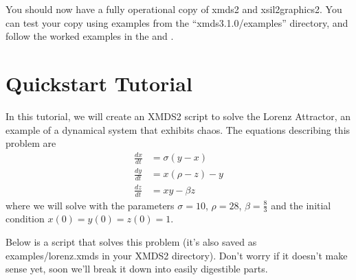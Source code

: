 \documentclass[letterpaper,10pt,english]{sphinxmanual}
\begin{document}
\sphinxAtStartPar
{} You should now have a fully operational copy of xmds2 and xsil2graphics2.  You can test your copy using examples from the “xmds\sphinxhyphen{}3.1.0/examples” directory, and follow the worked examples in the {\hyperref[\detokenize{tutorial:quickstarttutorial}]{}} and {\hyperref[\detokenize{worked_examples:workedexamples}]{}}.

\ignorespaces 

\chapter{Quickstart Tutorial}
\label{\detokenize{tutorial:quickstart-tutorial}}\label{\detokenize{tutorial:quickstarttutorial}}\label{\detokenize{tutorial:index-0}}\label{\detokenize{tutorial::doc}}
\sphinxAtStartPar
In this tutorial, we will create an XMDS2 script to solve the Lorenz Attractor, an example of a dynamical system that exhibits chaos. The equations describing this problem are
\begin{equation*}
\begin{split}\frac{dx}{dt} &= \sigma (y - x)\\
\frac{dy}{dt} &= x (\rho - z) - y\\
\frac{dz}{dt} &= xy - \beta z\end{split}
\end{equation*}
\sphinxAtStartPar
where we will solve with the parameters \(\sigma=10\), \(\rho=28\), \(\beta = \frac{8}{3}\) and the initial condition \(x(0) = y(0) = z(0) = 1\).

\sphinxAtStartPar
Below is a script that solves this problem (it’s also saved as examples/lorenz.xmds in your XMDS2 directory). Don’t worry if it doesn’t make sense yet, soon we’ll break it down into easily digestible parts.
\end{document}
